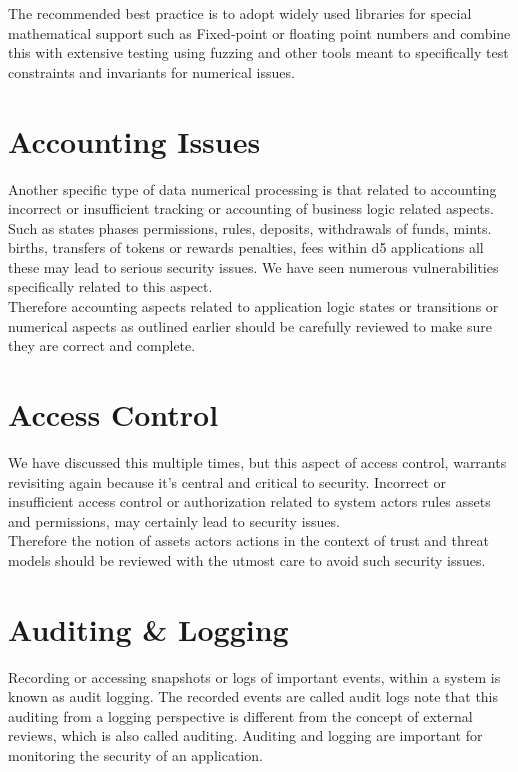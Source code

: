 The recommended best practice is to adopt widely used libraries for special mathematical support such as Fixed-point or floating point numbers and combine this with extensive testing using fuzzing and other tools meant to specifically test constraints and invariants for numerical issues.

\section{Accounting Issues}
Another specific type of data numerical processing is that related to accounting incorrect or insufficient tracking or accounting of business logic related aspects. Such as states phases permissions, rules, deposits, withdrawals of funds, mints. births, transfers of tokens or rewards penalties, fees within d5 applications all these may lead to serious security issues. We have seen numerous vulnerabilities specifically related to this aspect.\\

Therefore accounting aspects related to application logic states or transitions or numerical aspects as outlined earlier should be carefully reviewed to make sure they are correct and complete.

\section{Access Control}
We have discussed this multiple times, but this aspect of access control, warrants revisiting again because it's central and critical to security. Incorrect or insufficient access control or authorization related to system actors rules assets and permissions, may certainly lead to security issues.\\

Therefore the notion of assets actors actions in the context of trust and threat models should be reviewed with the utmost care to avoid such security issues.

\section{Auditing \& Logging}
Recording or accessing snapshots or logs of important events, within a system is known as audit logging. The recorded events are called audit logs note that this auditing from a logging perspective is different from the concept of external reviews, which is also called auditing. Auditing and logging are important for monitoring the security of an application.\\

